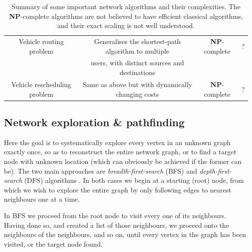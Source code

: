 \begin{table}[!htbp]
\begin{tabular}{|c|c|c|c|}
  		\hline
  		\rowcolor{Lavender} Vehicle routing problem & Generalises the shortest-path algorithm to multiple & \textbf{NP}-complete & ? \\
  		\rowcolor{Lavender} & users, with distinct sources and destinations & & \\ 
  		\hline
  		\rowcolor{Lavender} Vehicle rescheduling problem & Same as above but with dynamically changing costs & \textbf{NP}-complete & ? \\
    	\hline
	\end{tabular}
	\captionspacetab \caption{Summary of some important network algorithms and their complexities. The \textbf{NP}-complete algorithms are not believed to have efficient classical algorithms, and their exact scaling is not well understood.} \label{tab:net_alg_sum} 
\end{table}
\startalgtable

%
%

\subsection{Network exploration \& pathfinding} \label{sec:path_exp} 

Here the goal is to systematically explore every vertex in an unknown graph exactly once, so as to reconstruct the entire network graph, or to find a target node with unknown location (which can obviously be achieved if the former can be). The two main approaches are \textit{breadth-first-search} (BFS) and \textit{depth-first-search} (DFS) algorithms . In both cases we begin at a starting (root) node, from which we wish to explore the entire graph by only following edges to nearest neighbours one at a time.

In BFS we proceed from the root node to visit every one of its neighbours. Having done so, and created a list of those neighbours, we proceed onto the neighbours of the neighbours, and so on, until every vertex in the graph has been visited, or the target node found.


